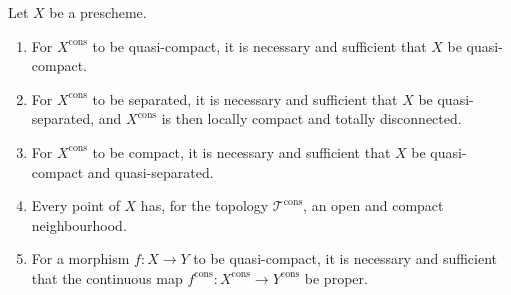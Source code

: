 \begin{proposition}[1.9.15]
\label{IV.1.9.15}
Let $X$ be a prescheme.
\begin{enumerate}
  \item[(i)] For $X^{\mathrm{cons}}$ to be quasi-compact, it is necessary and
  sufficient that $X$ be quasi-compact.
  \item[(ii)] For $X^{\mathrm{cons}}$ to be separated, it is necessary and
  sufficient that $X$ be quasi-separated, and $X^{\mathrm{cons}}$ is then
  locally compact and totally disconnected.
  \item[(iii)] For $X^{\mathrm{cons}}$ to be compact, it is necessary and
  sufficient that $X$ be quasi-compact and quasi-separated.
  \item[(iv)] Every point of $X$ has, for the topology
  $\mathscr T^{\mathrm{cons}}$, an open and compact neighbourhood.
  \item[(v)] For a morphism $f:X\to Y$ to be quasi-compact, it is necessary
  and sufficient that the continuous map
  $f^{\mathrm{cons}}:X^{\mathrm{cons}}\to Y^{\mathrm{cons}}$ be proper.
\end{enumerate}
\end{proposition}

